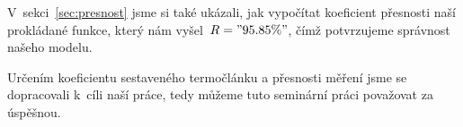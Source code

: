 V~sekci~\ref{sec:presnost} jsme si také ukázali, jak vypočítat koeficient
přesnosti naší prokládané funkce, který nám vyšel~$R="95.85 \%"$, čímž
potvrzujeme správnost našeho modelu.

Určením koeficientu sestaveného termočlánku a přesnosti měření jsme se
dopracovali k~cíli naší práce, tedy můžeme tuto seminární práci považovat za
úspěšnou.
